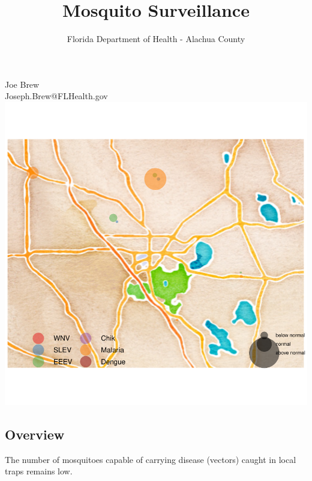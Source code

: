 \documentclass{article}
\title{Mosquito Surveillance}
\author{Florida Department of Health - Alachua County}
\begin{document}

\maketitle
\begin{center}
Joe Brew\\
Joseph.Brew@FLHealth.gov\\

\includegraphics{mosq08nov13-002}
\end{center}
\newpage
\tableofcontents




\begin{center}
\section*{Overview}

\end{center}
The number of mosquitoes capable of carrying disease (vectors) caught in local traps remains low.
\end{document}
